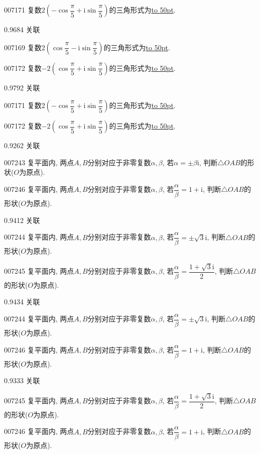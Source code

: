\documentclass[10pt,a4paper]{article}
\newcommand{\blank}[1]{\underline{\hbox to #1pt{}}}
\begin{document}
007171	复数$2(-\cos \dfrac{\pi }5+\mathrm{i}\sin \dfrac{\pi }5)$的三角形式为\blank{50}.



0.9684 关联

007169	复数$2(\cos \dfrac{\pi }5-\mathrm{i}\sin \dfrac{\pi }5)$的三角形式为\blank{50}.

007172	复数$-2(\cos \dfrac{\pi }5+\mathrm{i}\sin \dfrac{\pi }5)$的三角形式为\blank{50}.



0.9792 关联

007171	复数$2(-\cos \dfrac{\pi }5+\mathrm{i}\sin \dfrac{\pi }5)$的三角形式为\blank{50}.

007172	复数$-2(\cos \dfrac{\pi }5+\mathrm{i}\sin \dfrac{\pi }5)$的三角形式为\blank{50}.



0.9262 关联

007243	复平面内, 两点$A,B$分别对应于非零复数$\alpha ,\beta$, 若$\alpha =\pm \beta \mathrm{i}$, 判断$\triangle OAB$的形状($O$为原点).

007246	复平面内, 两点$A,B$分别对应于非零复数$\alpha ,\beta$, 若$\dfrac{\alpha }{\beta }=1+\mathrm{i}$, 判断$\triangle OAB$的形状($O$为原点).



0.9412 关联

007244	复平面内, 两点$A,B$分别对应于非零复数$\alpha ,\beta$, 若$\dfrac{\alpha }{\beta }=\pm \sqrt 3\mathrm{i}$, 判断$\triangle OAB$的形状($O$为原点).

007245	复平面内, 两点$A,B$分别对应于非零复数$\alpha ,\beta$, 若$\dfrac{\alpha }{\beta }=\dfrac{1+\sqrt 3\mathrm{i}}2$, 判断$\triangle OAB$的形状($O$为原点).



0.9434 关联

007244	复平面内, 两点$A,B$分别对应于非零复数$\alpha ,\beta$, 若$\dfrac{\alpha }{\beta }=\pm \sqrt 3\mathrm{i}$, 判断$\triangle OAB$的形状($O$为原点).

007246	复平面内, 两点$A,B$分别对应于非零复数$\alpha ,\beta$, 若$\dfrac{\alpha }{\beta }=1+\mathrm{i}$, 判断$\triangle OAB$的形状($O$为原点).



0.9333 关联

007245	复平面内, 两点$A,B$分别对应于非零复数$\alpha ,\beta$, 若$\dfrac{\alpha }{\beta }=\dfrac{1+\sqrt 3\mathrm{i}}2$, 判断$\triangle OAB$的形状($O$为原点).

007246	复平面内, 两点$A,B$分别对应于非零复数$\alpha ,\beta$, 若$\dfrac{\alpha }{\beta }=1+\mathrm{i}$, 判断$\triangle OAB$的形状($O$为原点).
\end{document}
